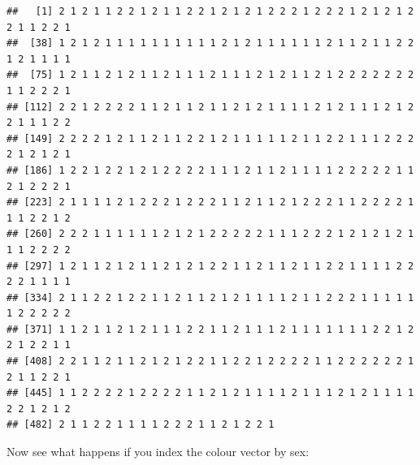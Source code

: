 \documentclass[
]{book}
\newenvironment{Shaded}{\begin{snugshade}}{\end{snugshade}}
\newcommand{\FunctionTok}[1]{\textcolor[rgb]{0.13,0.29,0.53}{\textbf{#1}}}
\newcommand{\NormalTok}[1]{#1}
\newcommand{\SpecialCharTok}[1]{\textcolor[rgb]{0.81,0.36,0.00}{\textbf{#1}}}
\newcommand{\StringTok}[1]{\textcolor[rgb]{0.31,0.60,0.02}{#1}}
\theoremstyle{definition}
\theoremstyle{definition}
\theoremstyle{definition}
\theoremstyle{definition}
\theoremstyle{remark}
\begin{document}
\begin{verbatim}
##   [1] 2 1 2 1 1 2 2 1 2 1 1 2 2 1 2 1 2 1 2 2 2 1 2 2 2 1 2 1 2 1 2 2 1 1 2 2 1
##  [38] 1 2 1 2 1 1 1 1 1 1 1 1 1 1 2 1 2 1 1 1 1 1 1 2 1 1 2 1 1 2 2 1 2 1 1 1 1
##  [75] 1 2 1 1 2 1 2 1 1 2 1 1 1 2 1 1 1 2 1 2 1 1 2 1 2 2 2 2 2 2 2 1 1 2 2 2 1
## [112] 2 2 1 2 2 2 2 1 1 2 1 1 2 1 1 2 1 2 1 1 1 1 2 1 2 1 1 1 2 1 2 2 1 1 1 2 2
## [149] 2 2 2 2 1 2 1 1 2 1 1 2 2 1 2 1 1 1 1 1 2 1 1 2 2 1 1 1 2 2 2 2 1 2 1 2 1
## [186] 1 2 2 1 2 2 1 2 1 2 2 2 2 1 1 1 2 1 1 2 1 1 1 1 2 2 2 2 2 1 1 2 1 2 2 2 1
## [223] 2 1 1 1 1 2 1 2 2 2 1 2 2 2 1 1 2 1 1 2 1 2 2 2 1 1 2 2 2 2 1 1 1 2 2 1 2
## [260] 2 2 2 1 1 1 1 1 1 2 1 2 1 2 2 2 2 2 1 1 1 2 2 2 1 2 1 2 1 2 1 1 1 2 2 2 2
## [297] 1 2 1 1 2 1 2 1 1 2 1 2 1 2 2 1 1 2 1 1 2 1 1 2 2 1 1 1 1 2 2 2 2 1 1 1 1
## [334] 2 1 1 2 2 1 2 2 1 1 2 1 1 2 1 2 1 1 1 1 2 1 1 2 2 2 1 1 1 1 1 1 2 2 2 2 2
## [371] 1 1 2 1 1 2 1 2 1 1 1 2 2 1 1 2 1 1 1 2 1 1 1 1 1 1 1 2 2 1 2 2 1 2 2 1 1
## [408] 2 2 1 1 2 1 1 2 1 2 1 2 2 1 1 2 2 1 2 2 2 2 1 1 2 2 2 2 2 2 1 2 1 1 2 2 1
## [445] 1 1 2 2 2 2 1 2 2 2 2 1 1 2 1 2 1 1 1 1 2 1 1 1 2 1 2 1 1 1 1 2 2 1 2 1 2
## [482] 2 1 1 2 2 1 1 1 1 2 2 2 1 1 2 1 2 2 1
\end{verbatim}

Now see what happens if you index the colour vector by sex:

\begin{Shaded}
\end{Shaded}
\end{document}
